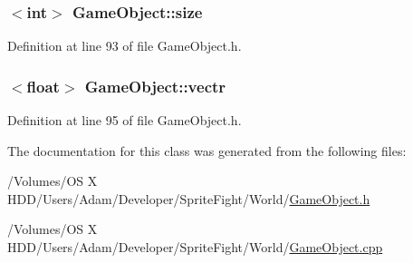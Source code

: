 \hypertarget{class_game_object_ac4637e122291be2421c851e2a87fb968}{
\subsubsection[{size}]{$<$int$>$ Game\-Object\-::size\hspace{0.3cm}{\ttfamily [protected]}}}\label{class_game_object_ac4637e122291be2421c851e2a87fb968}


Definition at line 93 of file Game\-Object.\-h.

\hypertarget{class_game_object_aebcdb5143027789a5f3b0f4ada2dac6b}{
\subsubsection[{vectr}]{$<$float$>$ Game\-Object\-::vectr\hspace{0.3cm}{\ttfamily [protected]}}}\label{class_game_object_aebcdb5143027789a5f3b0f4ada2dac6b}


Definition at line 95 of file Game\-Object.\-h.



The documentation for this class was generated from the following files\-:\begin{DoxyCompactItemize}
\item 
/\-Volumes/\-O\-S X H\-D\-D/\-Users/\-Adam/\-Developer/\-Sprite\-Fight/\-World/\hyperlink{_game_object_8h}{Game\-Object.\-h}\item 
/\-Volumes/\-O\-S X H\-D\-D/\-Users/\-Adam/\-Developer/\-Sprite\-Fight/\-World/\hyperlink{_game_object_8cpp}{Game\-Object.\-cpp}\end{DoxyCompactItemize}
